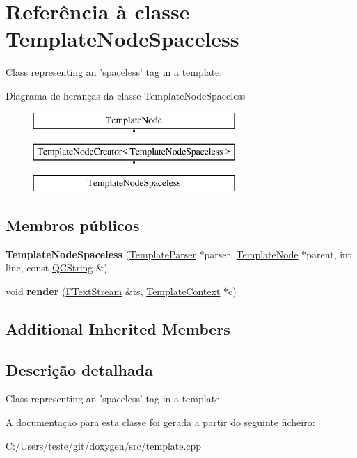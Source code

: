 \hypertarget{class_template_node_spaceless}{\section{Referência à classe Template\-Node\-Spaceless}
\label{class_template_node_spaceless}
}


Class representing an 'spaceless' tag in a template.  


Diagrama de heranças da classe Template\-Node\-Spaceless\begin{figure}[H]
\begin{center}
\leavevmode
\includegraphics[height=3.000000cm]{class_template_node_spaceless}
\end{center}
\end{figure}
\subsection*{Membros públicos}
\begin{DoxyCompactItemize}
\item 
\hypertarget{class_template_node_spaceless_a16c89f498e2f33ea539ab5a43753d706}{{\bfseries Template\-Node\-Spaceless} (\hyperlink{class_template_parser}{Template\-Parser} $\ast$parser, \hyperlink{class_template_node}{Template\-Node} $\ast$parent, int line, const \hyperlink{class_q_c_string}{Q\-C\-String} \&)}\label{class_template_node_spaceless_a16c89f498e2f33ea539ab5a43753d706}

\item 
\hypertarget{class_template_node_spaceless_aaa6575d8c79eeaa49f849f1ca1d6b228}{void {\bfseries render} (\hyperlink{class_f_text_stream}{F\-Text\-Stream} \&ts, \hyperlink{class_template_context}{Template\-Context} $\ast$c)}\label{class_template_node_spaceless_aaa6575d8c79eeaa49f849f1ca1d6b228}

\end{DoxyCompactItemize}
\subsection*{Additional Inherited Members}


\subsection{Descrição detalhada}
Class representing an 'spaceless' tag in a template. 

A documentação para esta classe foi gerada a partir do seguinte ficheiro\-:\begin{DoxyCompactItemize}
\item 
C\-:/\-Users/teste/git/doxygen/src/template.\-cpp\end{DoxyCompactItemize}
